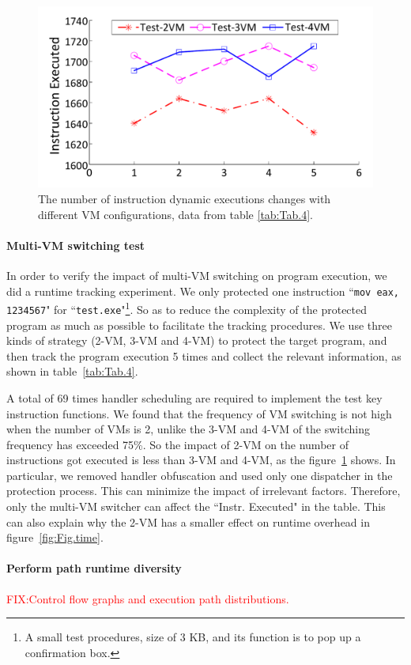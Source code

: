 \documentclass[times]{secauth}
\newcommand\FIXME[1]{\textcolor{red}{FIX:}\textcolor{red}{#1}}
\begin{document}
\begin{figure}[!t]
\centering
\includegraphics[width=.45\textwidth]{figure/testinstr.pdf}
\caption{The number of instruction dynamic executions changes with different VM configurations, data from table \ref{tab:Tab.4}.} \label{fig:Fig.testinstr}
\end{figure}

\paragraph*{Multi-VM switching test} In order to verify the impact of multi-VM switching on program execution, we did a runtime tracking experiment.
We only protected one instruction ``\texttt{mov eax, 1234567}" for ``\texttt{test.exe}"\footnote{A small test procedures, size of 3 KB, and its function is to pop up a confirmation box.}.
So as to reduce the complexity of the protected program as much as possible to facilitate the tracking procedures. 
We use three kinds of strategy (2-VM, 3-VM and 4-VM) to protect the target program, 
and then track the program execution 5 times and collect the relevant information, as shown in table~\ref{tab:Tab.4}. 

A total of 69 times handler scheduling are required to implement the test key instruction functions. 
We found that the frequency of VM switching is not high when the number of VMs is 2, 
unlike the 3-VM and 4-VM of the switching frequency has exceeded 75\%. 
So the impact of 2-VM on the number of instructions got executed is less than 3-VM and 4-VM, as the figure~\ref{fig:Fig.testinstr} shows.
In particular, we removed handler obfuscation and used only one dispatcher in the protection process. 
This can minimize the impact of irrelevant factors. 
Therefore, only the multi-VM switcher can affect the ``Instr. Executed" in the table. 
This can also explain why the 2-VM has a smaller effect on runtime overhead in figure~\ref{fig:Fig.time}.


\paragraph*{Perform path runtime diversity}
\FIXME{Control flow graphs and execution path distributions.}
\end{document}
